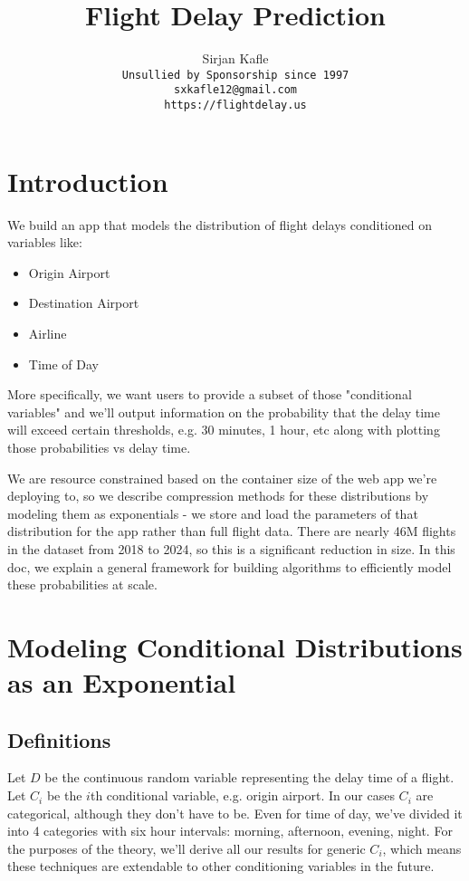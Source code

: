 \documentclass{article}
\title{Flight Delay Prediction}
\author{%
  Sirjan Kafle \\
  \texttt{Unsullied by Sponsorship since 1997} \\
  \texttt{sxkafle12@gmail.com} \\
  \texttt{https://flightdelay.us}
}
\begin{document}
\maketitle

\section{Introduction}
We build an app that models the distribution of flight delays conditioned on variables like:
\begin{itemize}
  \item Origin Airport
  \item Destination Airport
  \item Airline
  \item Time of Day
\end{itemize}

More specifically, we want users to provide a subset of those "conditional variables" and we'll output information on the probability that the delay
time will exceed certain thresholds, e.g. 30 minutes, 1 hour, etc along with plotting those probabilities vs delay time.

We are resource constrained based on the container size of the web app we're deploying to, so we describe compression methods for these distributions by modeling them as exponentials - we store
and load the parameters of that distribution for the app rather than full flight data. There are nearly 46M flights in the dataset from 2018 to 2024, so
this is a significant reduction in size. In this doc, we explain a general framework for building algorithms to efficiently model these probabilities at scale.

\section{Modeling Conditional Distributions as an Exponential}
\subsection{Definitions}
Let $D$ be the continuous random variable representing the delay time of a flight. Let $C_i$ be the $i$th conditional variable, e.g. origin airport.
In our cases $C_i$ are categorical, although they don't have to be. Even for time of day, we've divided it into 4 categories with six hour intervals: morning, afternoon, evening, night.
For the purposes of the theory, we'll derive all our results for generic $C_i$, which means these techniques are extendable to other conditioning variables
in the future.
\end{document}
